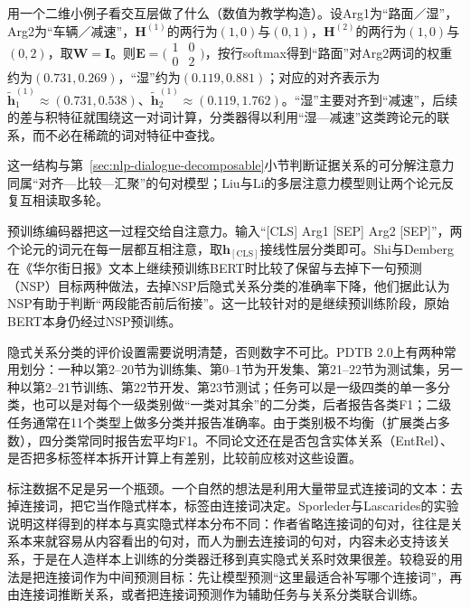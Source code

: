 用一个二维小例子看交互层做了什么（数值为教学构造）。设Arg1为“路面／湿”，Arg2为“车辆／减速”，$\bm H^{(1)}$的两行为$(1,0)$与$(0,1)$，$\bm H^{(2)}$的两行为$(1,0)$与$(0,2)$，取$\bm W=\bm I$。则$\bm E=\bigl(\begin{smallmatrix}1&0\\0&2\end{smallmatrix}\bigr)$，按行softmax得到“路面”对Arg2两词的权重约为$(0.731,0.269)$，“湿”约为$(0.119,0.881)$；对应的对齐表示为$\tilde{\bm h}^{(1)}_1\approx(0.731,0.538)$、$\tilde{\bm h}^{(1)}_2\approx(0.119,1.762)$。“湿”主要对齐到“减速”，后续的差与积特征就围绕这一对词计算，分类器得以利用“湿—减速”这类跨论元的联系，而不必在稀疏的词对特征中查找。

这一结构与第~\ref{sec:nlp-dialogue-decomposable}小节判断证据关系的可分解注意力同属“对齐—比较—汇聚”的句对模型；Liu与Li的多层注意力模型则让两个论元反复互相读取多轮。

预训练编码器把这一过程交给自注意力。输入“[CLS] Arg1 [SEP] Arg2 [SEP]”，两个论元的词元在每一层都互相注意，取$\bm h_{\mathrm{[CLS]}}$接线性层分类即可。Shi与Demberg在《华尔街日报》文本上继续预训练BERT时比较了保留与去掉下一句预测（NSP）目标两种做法，去掉NSP后隐式关系分类的准确率下降，他们据此认为NSP有助于判断“两段能否前后衔接”。这一比较针对的是继续预训练阶段，原始BERT本身仍经过NSP预训练。

隐式关系分类的评价设置需要说明清楚，否则数字不可比。PDTB 2.0上有两种常用划分：一种以第2--20节为训练集、第0--1节为开发集、第21--22节为测试集，另一种以第2--21节训练、第22节开发、第23节测试；任务可以是一级四类的单一多分类，也可以是对每个一级类别做“一类对其余”的二分类，后者报告各类F1；二级任务通常在11个类型上做多分类并报告准确率。由于类别极不均衡（扩展类占多数），四分类常同时报告宏平均F1。不同论文还在是否包含实体关系（EntRel）、是否把多标签样本拆开计算上有差别，比较前应核对这些设置。

标注数据不足是另一个瓶颈。一个自然的想法是利用大量带显式连接词的文本：去掉连接词，把它当作隐式样本，标签由连接词决定。Sporleder与Lascarides的实验说明这样得到的样本与真实隐式样本分布不同：作者省略连接词的句对，往往是关系本来就容易从内容看出的句对，而人为删去连接词的句对，内容未必支持该关系，于是在人造样本上训练的分类器迁移到真实隐式关系时效果很差。较稳妥的用法是把连接词作为中间预测目标：先让模型预测“这里最适合补写哪个连接词”，再由连接词推断关系，或者把连接词预测作为辅助任务与关系分类联合训练。

